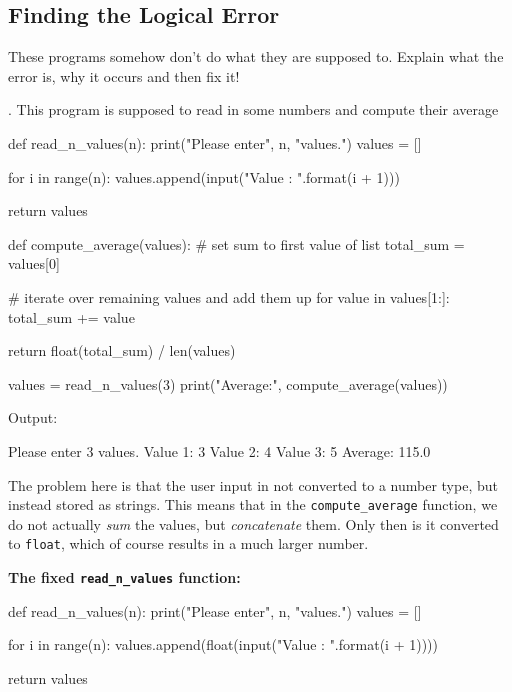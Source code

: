 \subsection{Finding the Logical Error}

These programs somehow don't do what they are supposed to. Explain what the error is, why it occurs and then fix it!

\vspace{1em}

. This program is supposed to read in some numbers and compute their average

\begin{pythoncode}
def read_n_values(n):
    print("Please enter", n, "values.")
    values = []

    for i in range(n):
        values.append(input("Value {}: ".format(i + 1)))

    return values

def compute_average(values):
    # set sum to first value of list
    total_sum = values[0]

    # iterate over remaining values and add them up
    for value in values[1:]:
        total_sum += value

    return float(total_sum) / len(values)

values = read_n_values(3)
print("Average:", compute_average(values))
\end{pythoncode}

Output:

\begin{outputcode}
Please enter 3 values.
Value 1: 3
Value 2: 4
Value 3: 5
Average: 115.0
\end{outputcode}

\begin{solution}
    The problem here is that the user input in not converted to a number type, but instead stored as strings. This means that in the \texttt{compute\_average} function, we do not actually \textit{sum} the values, but \textit{concatenate} them. Only then is it converted to \texttt{float}, which of course results in a much larger number.

    \vspace{1em}

    \noindent \textbf{The fixed \texttt{read\_n\_values} function:}

    \begin{pythoncode}
def read_n_values(n):
    print("Please enter", n, "values.")
    values = []

    for i in range(n):
        values.append(float(input("Value {}: ".format(i + 1))))

    return values
    \end{pythoncode}
\end{solution}

